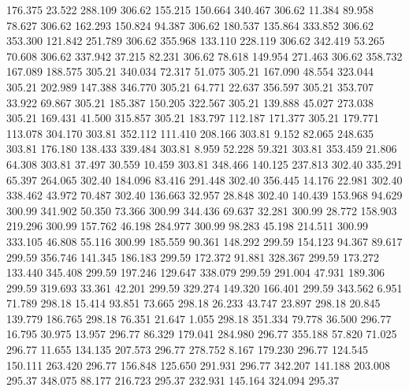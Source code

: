  176.375   23.522  288.109       306.62
 155.215  150.664  340.467       306.62
  11.384   89.958   78.627       306.62
 162.293  150.824   94.387       306.62
 180.537  135.864  333.852       306.62
 353.300  121.842  251.789       306.62
 355.968  133.110  228.119       306.62
 342.419   53.265   70.608       306.62
 337.942   37.215   82.231       306.62
  78.618  149.954  271.463       306.62
 358.732  167.089  188.575       305.21
 340.034   72.317   51.075       305.21
 167.090   48.554  323.044       305.21
 202.989  147.388  346.770       305.21
  64.771   22.637  356.597       305.21
 353.707   33.922   69.867       305.21
 185.387  150.205  322.567       305.21
 139.888   45.027  273.038       305.21
 169.431   41.500  315.857       305.21
 183.797  112.187  171.377       305.21
 179.771  113.078  304.170       303.81
 352.112  111.410  208.166       303.81
   9.152   82.065  248.635       303.81
 176.180  138.433  339.484       303.81
   8.959   52.228   59.321       303.81
 353.459   21.806   64.308       303.81
  37.497   30.559   10.459       303.81
 348.466  140.125  237.813       302.40
 335.291   65.397  264.065       302.40
 184.096   83.416  291.448       302.40
 356.445   14.176   22.981       302.40
 338.462   43.972   70.487       302.40
 136.663   32.957   28.848       302.40
 140.439  153.968   94.629       300.99
 341.902   50.350   73.366       300.99
 344.436   69.637   32.281       300.99
  28.772  158.903  219.296       300.99
 157.762   46.198  284.977       300.99
  98.283   45.198  214.511       300.99
 333.105   46.808   55.116       300.99
 185.559   90.361  148.292       299.59
 154.123   94.367   89.617       299.59
 356.746  141.345  186.183       299.59
 172.372   91.881  328.367       299.59
 173.272  133.440  345.408       299.59
 197.246  129.647  338.079       299.59
 291.004   47.931  189.306       299.59
 319.693   33.361   42.201       299.59
 329.274  149.320  166.401       299.59
 343.562    6.951   71.789       298.18
  15.414   93.851   73.665       298.18
  26.233   43.747   23.897       298.18
  20.845  139.779  186.765       298.18
  76.351   21.647    1.055       298.18
 351.334   79.778   36.500       296.77
  16.795   30.975   13.957       296.77
  86.329  179.041  284.980       296.77
 355.188   57.820   71.025       296.77
  11.655  134.135  207.573       296.77
 278.752    8.167  179.230       296.77
 124.545  150.111  263.420       296.77
 156.848  125.650  291.931       296.77
 342.207  141.188  203.008       295.37
 348.075   88.177  216.723       295.37
 232.931  145.164  324.094       295.37
